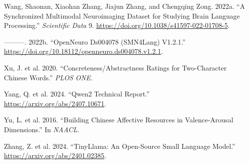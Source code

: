 \documentclass[
]{article}
\newlength{\cslhangindent}
\newenvironment{CSLReferences}[2] %
 {\begin{list}{}{%
  \setlength{\itemindent}{0pt}
  \setlength{\leftmargin}{0pt}
  \setlength{\parsep}{0pt}
  \ifodd #1
   \setlength{\leftmargin}{\cslhangindent}
   \setlength{\itemindent}{-1\cslhangindent}
  \fi
  \setlength{\itemsep}{#2\baselineskip}}}
 {\end{list}}
\begin{document}
\begin{CSLReferences}{1}{0}
Wang, Shaonan, Xiaohan Zhang, Jiajun Zhang, and Chengqing Zong. 2022a.
{``A Synchronized Multimodal Neuroimaging Dataset for Studying Brain
Language Processing.''} \emph{Scientific Data} 9.
\url{https://doi.org/10.1038/s41597-022-01708-5}.

---------. 2022b. {``OpenNeuro Ds004078 (SMN4Lang) V1.2.1.''}
\url{https://doi.org/10.18112/openneuro.ds004078.v1.2.1}.

Xu, J. et al. 2020. {``Concreteness/Abstractness Ratings for
Two-Character Chinese Words.''} \emph{PLOS ONE}.

Yang, Q. et al. 2024. {``Qwen2 Technical Report.''}
\url{https://arxiv.org/abs/2407.10671}.

Yu, L. et al. 2016. {``Building Chinese Affective Resources in
Valence-Arousal Dimensions.''} In \emph{NAACL}.

Zhang, Z. et al. 2024. {``TinyLlama: An Open-Source Small Language
Model.''} \url{https://arxiv.org/abs/2401.02385}.

\end{CSLReferences}
\end{document}
